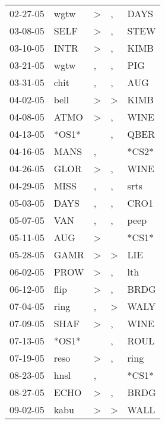 \begin{supertabular}{lllll}
 02-27-05 &   wgtw &     \textgreater &                , &   DAYS \\
 03-08-05 &   SELF &     \textgreater &                , &   STEW \\
 03-10-05 &   INTR &     \textgreater &                , &   KIMB \\
 03-21-05 &   wgtw &                , &                , &    PIG \\
 03-31-05 &   chit &                , &                , &    AUG \\
 04-02-05 &   bell &     \textgreater &     \textgreater &   KIMB \\
 04-08-05 &   ATMO &     \textgreater &                , &   WINE \\
 04-13-05 &  *OS1* &                  &                , &   QBER \\
 04-16-05 &   MANS &                , &                  &  *CS2* \\
 04-26-05 &   GLOR &     \textgreater &                , &   WINE \\
 04-29-05 &   MISS &                , &                , &   srts \\
 05-03-05 &   DAYS &                , &                , &   CRO1 \\
 05-07-05 &    VAN &                , &                , &   peep \\
 05-11-05 &    AUG &     \textgreater &                  &  *CS1* \\
 05-28-05 &   GAMR &     \textgreater &     \textgreater &    LIE \\
 06-02-05 &   PROW &     \textgreater &                , &    lth \\
 06-12-05 &   flip &     \textgreater &                , &   BRDG \\
 07-04-05 &   ring &                , &     \textgreater &   WALY \\
 07-09-05 &   SHAF &     \textgreater &                , &   WINE \\
 07-13-05 &  *OS1* &                  &                , &   ROUL \\
 07-19-05 &   reso &     \textgreater &                , &   ring \\
 08-23-05 &   hnsl &                , &                  &  *CS1* \\
 08-27-05 &   ECHO &     \textgreater &                , &   BRDG \\
 09-02-05 &   kabu &     \textgreater &     \textgreater &   WALL \\

\end{supertabular}
